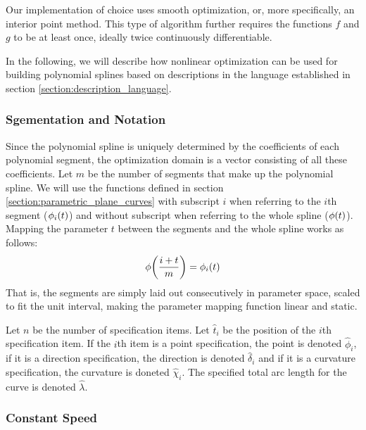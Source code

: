 \documentclass[a4paper]{article}
\begin{document}
				Our implementation of choice uses smooth optimization, or, more specifically, an interior point method. This type of algorithm further requires the functions \(f\) and \(g\) to be at least once, ideally twice continuously differentiable.

				In the following, we will describe how nonlinear optimization can be used for building polynomial splines based on descriptions in the language established in section \ref{section:description_language}.

			\subsubsection{Sgementation and Notation}
			\label{section:segmentation_notation}

				Since the polynomial spline is uniquely determined by the coefficients of each polynomial segment, the optimization domain is a vector consisting of all these coefficients. Let \(m\) be the number of segments that make up the polynomial spline. We will use the functions defined in section \ref{section:parametric_plane_curves} with subscript \(i\) when referring to the \(i\)th segment (\(\phi_i\!\left( t \right)\)) and without subscript when referring to the whole spline (\(\phi\!\left( t \right)\)). Mapping the parameter \(t\) between the segments and the whole spline works as follows:
				\begin{equation*}
					\phi\!\left( \frac{i + t}{m} \right) = \phi_i\!\left( t \right)
				\end{equation*}
				That is, the segments are simply laid out consecutively in parameter space, scaled to fit the unit interval, making the parameter mapping function linear and static.

				Let \(n\) be the number of specification items. Let \(\hat{t}_i\) be the position of the \(i\)th specification item. If the \(i\)th item is a point specification, the point is denoted \(\hat{\phi}_i\), if it is a direction specification, the direction is denoted \(\hat{\delta}_i\) and if it is a curvature specification, the curvature is doneted \(\hat{\chi}_i\). The specified total arc length for the curve is denoted \(\hat{\lambda}\).

			\subsubsection{Constant Speed}
			\label{section:constant_speed}
\end{document}
